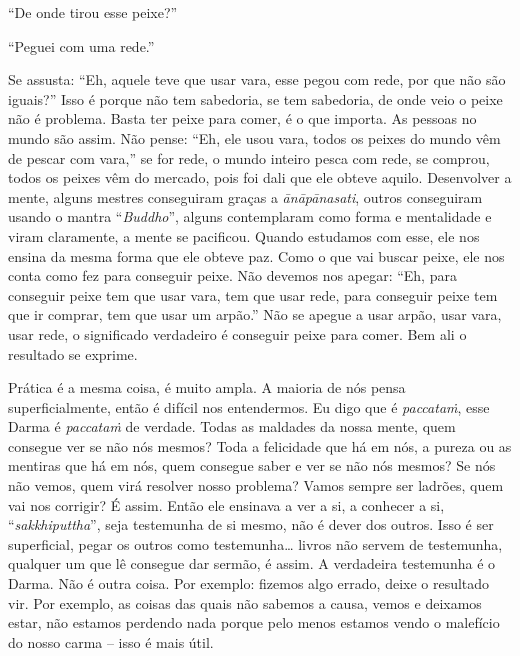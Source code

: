 “De onde tirou esse peixe?” 

“Peguei com uma rede.” 

Se assusta: “Eh, aquele teve que usar vara, esse pegou com rede, por
que não são iguais?” Isso é porque não tem sabedoria, se tem sabedoria,
de onde veio o peixe não é problema. Basta ter peixe para comer, é o
que importa. As pessoas no mundo são assim. Não pense: “Eh, ele usou
vara, todos os peixes do mundo vêm de pescar com vara,” se for rede, o
mundo inteiro pesca com rede, se comprou, todos os peixes vêm do
mercado, pois foi dali que ele obteve aquilo. Desenvolver a mente,
alguns mestres conseguiram graças a \emph{ānāpānasati}, outros
conseguiram usando o mantra “\emph{Buddho}”, alguns contemplaram como
forma e mentalidade e viram claramente, a mente se pacificou. Quando
estudamos com esse, ele nos ensina da mesma forma que ele obteve paz.
Como o que vai buscar peixe, ele nos conta como fez para conseguir
peixe. Não devemos nos apegar: “Eh, para conseguir peixe tem que usar
vara, tem que usar rede, para conseguir peixe tem que ir comprar, tem
que usar um arpão.” Não se apegue a usar arpão, usar vara, usar rede, o
significado verdadeiro é conseguir peixe para comer. Bem ali o
resultado se exprime. 

Prática é a mesma coisa, é muito ampla. A maioria de nós pensa
superficialmente, então é difícil nos entendermos. Eu digo que é
\emph{paccataṁ}, esse Darma é \emph{paccataṁ} de verdade. Todas as
maldades da nossa mente, quem consegue ver se não nós mesmos? Toda a
felicidade que há em nós, a pureza ou as mentiras que há em nós, quem
consegue saber e ver se não nós mesmos? Se nós não vemos, quem virá
resolver nosso problema? Vamos sempre ser ladrões, quem vai nos
corrigir? É assim. Então ele ensinava a ver a si, a conhecer a si,
“\emph{sakkhiputtha}”, seja testemunha de si mesmo, não é dever dos
outros. Isso é ser superficial, pegar os outros como testemunha\ldots{} livros
não servem de testemunha, qualquer um que lê consegue dar sermão, é
assim. A verdadeira testemunha é o Darma. Não é outra coisa. Por
exemplo: fizemos algo errado, deixe o resultado vir. Por exemplo, as
coisas das quais não sabemos a causa, vemos e deixamos estar, não
estamos perdendo nada porque pelo menos estamos vendo o malefício do
nosso carma – isso é mais útil. 

